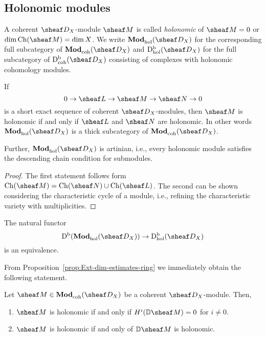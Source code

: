\documentclass[number-in-sections,a4paper]{notes}
\begin{document}
\subsection{Holonomic modules}

\begin{Definition}\label{def:holonomic}
    A coherent $\sD_X$-module $\sheaf M$ is called \emph{holonomic} of $\sheaf M = 0$ or $\dim \Ch(\sheaf M) = \dim X$.
    We write $\catDModhol{X}$ for the corresponding full subcategory of $\catDModcoh{X}$ and $\catDbDModhol{X}$ for the full subcategory of $\catDbDModcoh{X}$ consisting of complexes with holonomic cohomology modules.
\end{Definition}

\begin{Lemma}\label{lem:hol_thick_and_artinian}
    If
    \[
        0 \to \sheaf L \to \sheaf M \to \sheaf N \to 0
    \]
    is a short exact sequence of coherent $\sD_X$-modules, then $\sheaf M$ is holonomic if and only if $\sheaf L$ and $\sheaf N$ are holonomic.
    In other words $\catDModhol{X}$ is a thick subcategory of $\catDModcoh{X}$.

    Further, $\catDModhol{X}$ is artinian, i.e., every holonomic module satisfies the descending chain condition for submodules.
\end{Lemma}

\begin{proof}
    The first statement follows form $\Ch(\sheaf M) = \Ch(\sheaf N) \cup \Ch(\sheaf L)$.
    The second can be shown considering the characteristic cycle of a module, i.e., refining the characteristic variety with multiplicities.
\end{proof}

\begin{Fact}
    The natural functor
    \[
        \catDb{\catDModhol{X}} \to \catDbDModhol{X}
    \]
    is an equivalence.
\end{Fact}

From Proposition~\ref{prop:Ext-dim-estimates-ring} we immediately obtain the following statement.

\begin{Proposition}
    Let $\sheaf M \in \catDModcoh{X}$ be a coherent $\sD_X$-module.
    Then,
    \begin{enumerate}
        \item $\sheaf M$ is holonomic if and only if $H^i(\DD\sheaf M) = 0$ for $i \ne 0$.
        \item $\sheaf M$ is holonomic if and only of $\DD\sheaf M$ is holonomic.
    \end{enumerate}
\end{Proposition}
\end{document}
